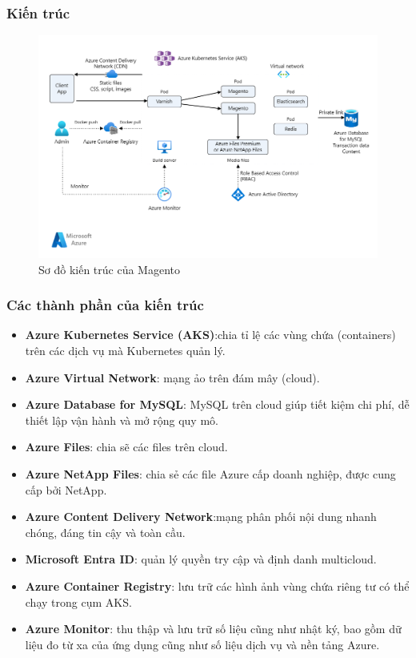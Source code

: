 \subsubsection{Kiến trúc}
\begin{figure}[H]
    \centering
    \includegraphics[scale=0.7]{images/hieu/chap-2/magento-architecture.png}
    \caption{Sơ đồ kiến trúc của Magento}
\end{figure}    
\subsubsection{Các thành phần của kiến trúc}
    \begin{itemize}
        \item \textbf{Azure Kubernetes Service (AKS)}:chia tỉ lệ các vùng chứa (containers) trên các dịch vụ mà Kubernetes quản lý.
        \item \textbf{Azure Virtual Network}: mạng ảo trên đám mây (cloud).
        \item \textbf{Azure Database for MySQL}: MySQL trên cloud giúp tiết kiệm chi phí, dễ thiết lập vận hành và mở rộng quy mô.
        \item \textbf{Azure Files}: chia sẽ các files trên cloud.
        \item \textbf{Azure NetApp Files}: chia sẻ các file Azure cấp doanh nghiệp, được cung cấp bởi NetApp.
        \item \textbf{Azure Content Delivery Network}:mạng phân phối nội dung nhanh chóng, đáng tin cậy và toàn cầu.
        \item \textbf{Microsoft Entra ID}: quản lý quyền try cập và định danh multicloud.
        \item \textbf{Azure Container Registry}: lưu trữ các hình ảnh vùng chứa riêng tư có thể chạy trong cụm AKS.
        \item \textbf{Azure Monitor}: thu thập và lưu trữ số liệu cũng như nhật ký, bao gồm dữ liệu đo từ xa của ứng dụng cũng như số liệu dịch vụ và nền tảng Azure.
    \end{itemize} 
